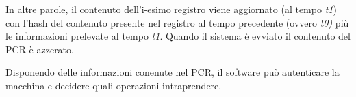 In altre parole, il contenuto dell'i-esimo registro viene aggiornato (al tempo \textit{t1}) con l'hash del contenuto presente nel registro al tempo precedente (ovvero \textit{t0)} più le informazioni prelevate al tempo \textit{t1}. Quando il sistema è evviato il contenuto del PCR è azzerato.

Disponendo delle informazioni conenute nel PCR, il software può autenticare la macchina e decidere quali operazioni intraprendere.
\cite{wiki_tpm}